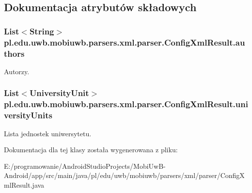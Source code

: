 \subsection{Dokumentacja atrybutów składowych}
\hypertarget{classpl_1_1edu_1_1uwb_1_1mobiuwb_1_1parsers_1_1xml_1_1parser_1_1_config_xml_result_ae06cc4d398e7acbdf759e259fca6d8f2}{}
\subsubsection[{authors}]{\setlength{\rightskip}{0pt plus 5cm}List$<$String$>$ pl.\+edu.\+uwb.\+mobiuwb.\+parsers.\+xml.\+parser.\+Config\+Xml\+Result.\+authors}\label{classpl_1_1edu_1_1uwb_1_1mobiuwb_1_1parsers_1_1xml_1_1parser_1_1_config_xml_result_ae06cc4d398e7acbdf759e259fca6d8f2}
Autorzy. \hypertarget{classpl_1_1edu_1_1uwb_1_1mobiuwb_1_1parsers_1_1xml_1_1parser_1_1_config_xml_result_aa961210a445db8973482d65dd8bf9967}{}
\subsubsection[{university\+Units}]{\setlength{\rightskip}{0pt plus 5cm}List$<${\bf University\+Unit}$>$ pl.\+edu.\+uwb.\+mobiuwb.\+parsers.\+xml.\+parser.\+Config\+Xml\+Result.\+university\+Units}\label{classpl_1_1edu_1_1uwb_1_1mobiuwb_1_1parsers_1_1xml_1_1parser_1_1_config_xml_result_aa961210a445db8973482d65dd8bf9967}
Lista jednostek uniwersytetu. 

Dokumentacja dla tej klasy została wygenerowana z pliku\+:\begin{DoxyCompactItemize}
\item 
E\+:/programowanie/\+Android\+Studio\+Projects/\+Mobi\+Uw\+B-\/\+Android/app/src/main/java/pl/edu/uwb/mobiuwb/parsers/xml/parser/Config\+Xml\+Result.\+java\end{DoxyCompactItemize}
